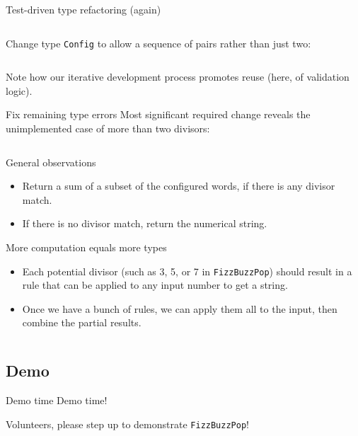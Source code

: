\begin{frame}[fragile]{Test-driven type refactoring (again)}
  \inputminted{console}{testQuick8.console}

  Change \alert{type} \texttt{Config} to allow a sequence of pairs rather than just two:

  \inputminted[gobble=2]{scala}{FizzBuzz3Seq.scala}

  Note how our iterative development process promotes \alert{reuse} (here, of validation logic).
\end{frame}

\begin{frame}[fragile]{Fix remaining type errors}
  Most significant required change reveals the unimplemented case of more than two divisors:
  \inputminted[gobble=2]{scala}{FizzBuzz3SeqCompile.scala}
\end{frame}

\begin{frame}[fragile]{General observations}
  \begin{itemize}
  \item Return a sum of a subset of the configured words, if there is any divisor match.
  \item If there is \alert{no} divisor match, return the numerical string.
  \end{itemize}
\end{frame}

\begin{frame}[fragile]{More computation equals more types}
  \begin{itemize}
  \item Each potential divisor (such as 3, 5, or 7 in \texttt{FizzBuzzPop}) should result in a \alert{rule} that can be applied to any input number to get a string.
  \item Once we have a bunch of rules, we can apply them all to the input, then combine the partial results.
  \end{itemize}

  \inputminted[gobble=2]{scala}{FizzBuzz4.scala}
\end{frame}

\subsection{Demo}

\begin{frame}{Demo time}
  Demo time!

  Volunteers, please step up to demonstrate \texttt{FizzBuzzPop}!
\end{frame}

